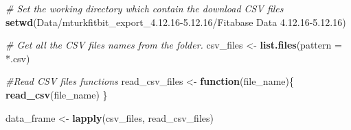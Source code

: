 \documentclass[
]{article}
\newenvironment{Shaded}{\begin{snugshade}}{\end{snugshade}}
\newcommand{\AttributeTok}[1]{\textcolor[rgb]{0.13,0.29,0.53}{#1}}
\newcommand{\CommentTok}[1]{\textcolor[rgb]{0.56,0.35,0.01}{\textit{#1}}}
\newcommand{\ControlFlowTok}[1]{\textcolor[rgb]{0.13,0.29,0.53}{\textbf{#1}}}
\newcommand{\FunctionTok}[1]{\textcolor[rgb]{0.13,0.29,0.53}{\textbf{#1}}}
\newcommand{\NormalTok}[1]{#1}
\newcommand{\OtherTok}[1]{\textcolor[rgb]{0.56,0.35,0.01}{#1}}
\newcommand{\StringTok}[1]{\textcolor[rgb]{0.31,0.60,0.02}{#1}}
\begin{document}
\begin{Shaded}
\begin{Highlighting}[]
\CommentTok{\# Set the working directory which contain the download CSV files}
\FunctionTok{setwd}\NormalTok{(}\StringTok{\textquotesingle{}Data/mturkfitbit\_export\_4.12.16{-}5.12.16/Fitabase Data 4.12.16{-}5.12.16\textquotesingle{}}\NormalTok{)}

\CommentTok{\# Get all the CSV files names from the folder.}
\NormalTok{csv\_files }\OtherTok{\textless{}{-}} \FunctionTok{list.files}\NormalTok{(}\AttributeTok{pattern =} \StringTok{\textquotesingle{}*.csv\textquotesingle{}}\NormalTok{)}

\CommentTok{\#Read CSV files functions}
\NormalTok{read\_csv\_files }\OtherTok{\textless{}{-}} \ControlFlowTok{function}\NormalTok{(file\_name)\{}
  \FunctionTok{read\_csv}\NormalTok{(file\_name)}
\NormalTok{\}}

\NormalTok{data\_frame }\OtherTok{\textless{}{-}} \FunctionTok{lapply}\NormalTok{(csv\_files, read\_csv\_files)}
\end{Highlighting}
\end{Shaded}
\end{document}
